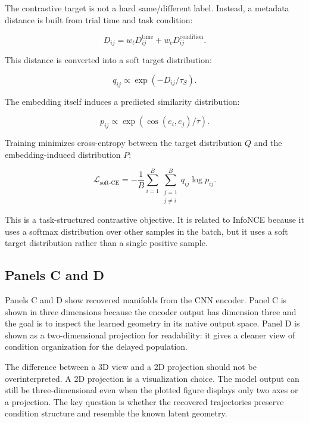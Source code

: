 \documentclass[11pt]{article}
\begin{document}
The contrastive target is not a hard same/different label. Instead, a
metadata distance is built from trial time and task condition:

\begin{equation}
D_{ij}
=
w_t D^{\text{time}}_{ij}
+
w_c D^{\text{condition}}_{ij}.
\end{equation}

This distance is converted into a soft target distribution:

\begin{equation}
q_{ij}
\propto
\exp(-D_{ij}/\tau_S).
\end{equation}

The embedding itself induces a predicted similarity distribution:

\begin{equation}
p_{ij}
\propto
\exp
\left(
\operatorname{cos}(e_i,e_j)/\tau
\right).
\end{equation}

Training minimizes cross-entropy between the target distribution $Q$ and the
embedding-induced distribution $P$:

\begin{equation}
\mathcal{L}_{\text{soft-CE}}
=
-
\frac{1}{B}
\sum_{i=1}^{B}
\sum_{\substack{j=1 \\ j \ne i}}^{B}
q_{ij}\log p_{ij}.
\end{equation}

This is a task-structured contrastive objective. It is related to InfoNCE
because it uses a softmax distribution over other samples in the batch, but it
uses a soft target distribution rather than a single positive sample.

\subsection{Panels C and D}

Panels C and D show recovered manifolds from the CNN encoder. Panel C is shown
in three dimensions because the encoder output has dimension three and the
goal is to inspect the learned geometry in its native output space. Panel D is
shown as a two-dimensional projection for readability: it gives a cleaner view
of condition organization for the delayed population.

The difference between a 3D view and a 2D projection should not be
overinterpreted. A 2D projection is a visualization choice. The model output
can still be three-dimensional even when the plotted figure displays only two
axes or a projection. The key question is whether the recovered trajectories
preserve condition structure and resemble the known latent geometry.
\end{document}
